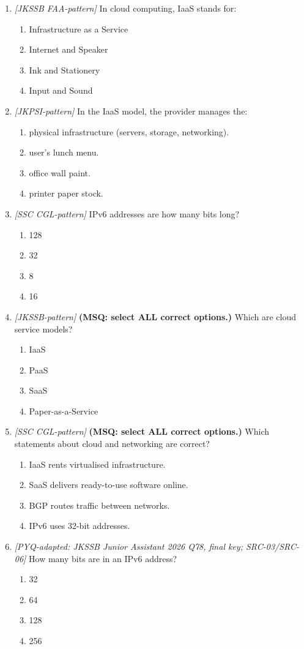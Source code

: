 \begin{enumerate}[label=\textbf{Q\arabic*.}, leftmargin=*]
\item \textit{[JKSSB FAA-pattern]} In cloud computing, IaaS stands for:
  \begin{enumerate}[label=\Alph*.]
    \item Infrastructure as a Service
    \item Internet and Speaker
    \item Ink and Stationery
    \item Input and Sound
  \end{enumerate}
\item \textit{[JKPSI-pattern]} In the IaaS model, the provider manages the:
  \begin{enumerate}[label=\Alph*.]
    \item physical infrastructure (servers, storage, networking).
    \item user's lunch menu.
    \item office wall paint.
    \item printer paper stock.
  \end{enumerate}
\item \textit{[SSC CGL-pattern]} IPv6 addresses are how many bits long?
  \begin{enumerate}[label=\Alph*.]
    \item 128
    \item 32
    \item 8
    \item 16
  \end{enumerate}
\item \textit{[JKSSB-pattern]} \textbf{(MSQ: select ALL correct options.)} Which are cloud service models?
  \begin{enumerate}[label=\Alph*.]
    \item IaaS
    \item PaaS
    \item SaaS
    \item Paper-as-a-Service
  \end{enumerate}
\item \textit{[SSC CGL-pattern]} \textbf{(MSQ: select ALL correct options.)} Which statements about cloud and networking are correct?
  \begin{enumerate}[label=\Alph*.]
    \item IaaS rents virtualised infrastructure.
    \item SaaS delivers ready-to-use software online.
    \item BGP routes traffic between networks.
    \item IPv6 uses 32-bit addresses.
  \end{enumerate}
\item \textit{[PYQ-adapted: JKSSB Junior Assistant 2026 Q78, final key; SRC-03/SRC-06]} How many bits are in an IPv6 address?
  \begin{enumerate}[label=\Alph*.]
\item 32
   \item 64
   \item 128
   \item 256
  \end{enumerate}


\end{enumerate}
